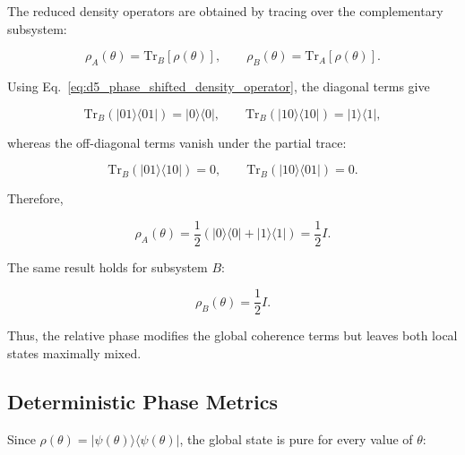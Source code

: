 The reduced density operators are obtained by tracing over the complementary subsystem:

\begin{equation}
\rho_A(\theta)
=
\mathrm{Tr}_B[\rho(\theta)],
\qquad
\rho_B(\theta)
=
\mathrm{Tr}_A[\rho(\theta)].
\label{eq:d5_phase_shifted_reduced_density_definitions}
\end{equation}

Using Eq.~\eqref{eq:d5_phase_shifted_density_operator}, the diagonal terms give

\begin{equation}
\mathrm{Tr}_B(|01\rangle\langle 01|)
=
|0\rangle\langle 0|,
\qquad
\mathrm{Tr}_B(|10\rangle\langle 10|)
=
|1\rangle\langle 1|,
\label{eq:d5_phase_shifted_partial_trace_diagonal_A}
\end{equation}

whereas the off-diagonal terms vanish under the partial trace:

\begin{equation}
\mathrm{Tr}_B(|01\rangle\langle 10|)=0,
\qquad
\mathrm{Tr}_B(|10\rangle\langle 01|)=0.
\label{eq:d5_phase_shifted_partial_trace_offdiagonal_A}
\end{equation}

Therefore,

\begin{equation}
\rho_A(\theta)
=
\frac{1}{2}
\left(
|0\rangle\langle 0|
+
|1\rangle\langle 1|
\right)
=
\frac{1}{2}I.
\label{eq:d5_phase_shifted_reduced_density_A}
\end{equation}

The same result holds for subsystem \( B \):

\begin{equation}
\rho_B(\theta)
=
\frac{1}{2}I.
\label{eq:d5_phase_shifted_reduced_density_B}
\end{equation}

Thus, the relative phase modifies the global coherence terms but leaves both local states maximally mixed.


\subsection{Deterministic Phase Metrics}

Since \( \rho(\theta)=|\psi(\theta)\rangle\langle\psi(\theta)| \), the global state is pure for every value of \( \theta \):

